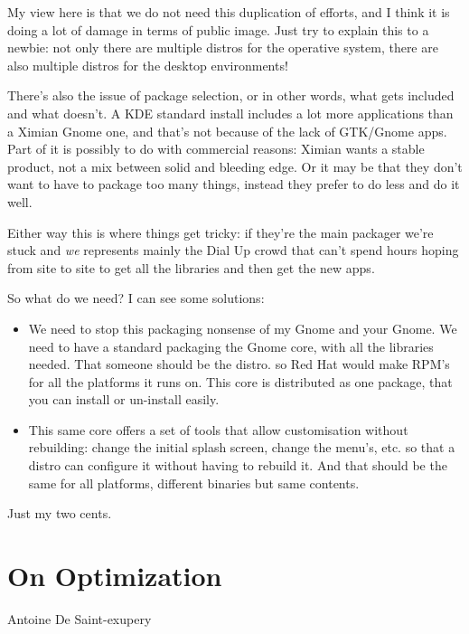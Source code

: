 \documentclass{memoir}
\begin{document}
My view here is that we do not need this duplication of efforts, and I
think it is doing a lot of damage in terms of public image. Just try
to explain this to a newbie: not only there are multiple distros for
the operative system, there are also multiple distros for the desktop
environments!

There's also the issue of package selection, or in other words, what
gets included and what doesn't. A KDE standard install includes a lot
more applications than a Ximian Gnome one, and that's not because of
the lack of GTK/Gnome apps. Part of it is possibly to do with
commercial reasons: Ximian wants a stable product, not a mix between
solid and bleeding edge. Or it may be that they don't want to have to
package too many things, instead they prefer to do less and do it
well.

Either way this is where things get tricky: if they're the main
packager we're stuck and \emph{we} represents mainly the Dial Up crowd
that can't spend hours hoping from site to site to get all the
libraries and then get the new apps.

So what do we need? I can see some solutions:

\begin{itemize}
\item We need to stop this packaging nonsense of my Gnome and your
  Gnome. We need to have a standard packaging the Gnome core, with all
  the libraries needed. That someone should be the distro. so Red Hat
  would make RPM's for all the platforms it runs on. This core is
  distributed as one package, that you can install or un-install
  easily.
\item This same core offers a set of tools that allow customisation
  without rebuilding: change the initial splash screen, change the
  menu's, etc. so that a distro can configure it without having to
  rebuild it. And that should be the same for all platforms, different
  binaries but same contents.
\end{itemize}

Just my two cents.

\chapter{On Optimization}

\begin{epigraphs}
      {Antoine De Saint-exupery}
\end{epigraphs}
\end{document}
